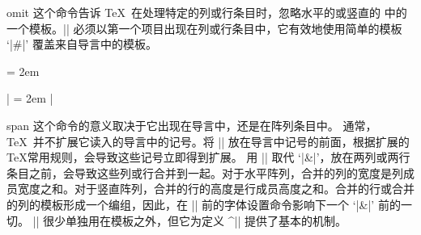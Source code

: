 \begindesc
\cts omit {}
\explain
这个命令告诉 \TeX\ 在处理特定的列或行条目时，忽略水平的或竖直的 中的一个模板。|\omit| 必须以第一个项目出现在列或行条目中，它有效地使用简单的模板 `|#|' 覆盖来自导言中的模板。

\example
\tabskip = 2em

|
\produces
\tabskip = 2em
\nextexample
{\hsize=1.2in \parindent=0pt
}
|
\produces
{\hsize=1.2in \parindent=0pt \leftskip=0pt
}
\endexample
\enddesc

\begindesc
\cts span {}
\explain
这个命令的意义取决于它出现在导言中，还是在阵列条目中。
\ulist
\li 通常，\TeX\ 并不扩展它读入的导言中的记号。将 |\span| 放在导言中记号的前面，根据扩展的 \TeX 常用规则，会导致这些记号立即得到扩展。
\li 用 |\span| 取代 `|&|'，放在两列或两行条目之前，会导致这些列或行合并到一起。对于水平阵列，合并的列的宽度是列成员宽度之和。对于竖直阵列，合并的行的高度是行成员高度之和。合并的行或合并的列的模板形成一个编组，因此，在 |\span| 前的字体设置命令影响下一个 `|&|' 前的一切。
\endulist
\noindent
|\span| 很少单独用在模板之外，但它为定义 ^|\multispan| 提供了基本的机制。
\enddesc


